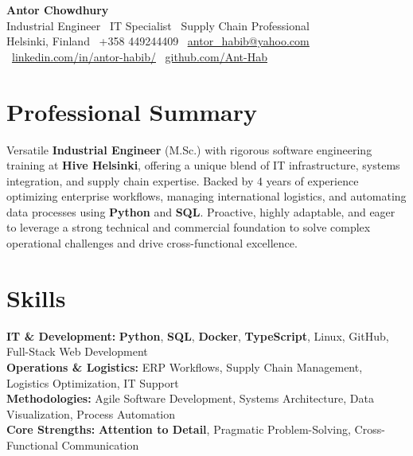 \documentclass[a4paper,11pt]{article}
\begin{document}
\vspace*{2pt}

\begin{center}
    {\Huge {}\selectfont \textbf{Antor Chowdhury}} \\[4pt]
    {\large {}\selectfont Industrial Engineer \textbar\ IT Specialist \textbar\ Supply Chain Professional} \\[4pt]
    \small
    Helsinki, Finland \textbar\ +358 449244409 \textbar\ 
    \href{mailto:antor_habib@yahoo.com}{\underline{antor\_habib@yahoo.com}} \textbar\ 
    \href{https://www.linkedin.com/in/antor-habib/}{\underline{linkedin.com/in/antor-habib/}} \textbar\ 
    \href{https://github.com/Ant-Hab}{\underline{github.com/Ant-Hab}}
\end{center}

\vspace{0pt}

\section{Professional Summary}
\begin{justify}
\small{
Versatile \textbf{Industrial Engineer} (M.Sc.) with rigorous software engineering training at \textbf{Hive Helsinki}, offering a unique blend of IT infrastructure, systems integration, and supply chain expertise. Backed by 4 years of experience optimizing enterprise workflows, managing international logistics, and automating data processes using \textbf{Python} and \textbf{SQL}. Proactive, highly adaptable, and eager to leverage a strong technical and commercial foundation to solve complex operational challenges and drive cross-functional excellence.
}
\end{justify}

\vspace{-6pt}

\section{Skills}
\begin{itemize}[leftmargin=0.15in, label={}, itemsep=0pt, topsep=1pt]
\small{\item{
\textbf{IT \& Development:} \textbf{Python}, \textbf{SQL}, \textbf{Docker}, \textbf{TypeScript}, Linux, GitHub, Full-Stack Web Development \\
\textbf{Operations \& Logistics:} ERP Workflows, Supply Chain Management, Logistics Optimization, IT Support \\
\textbf{Methodologies:} Agile Software Development, Systems Architecture, Data Visualization, Process Automation \\
\textbf{Core Strengths:} \textbf{Attention to Detail}, Pragmatic Problem-Solving, Cross-Functional Communication
}}
\end{itemize}
\end{document}
